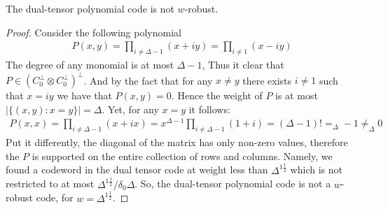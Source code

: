 \begin{claim}
 \label{claim:nowr} The dual-tensor polynomial code is not $w$-robust. 
\end{claim}

\begin{proof}
Consider the following polynomial 
  \begin{equation*}
    \begin{split}
      P(x,y) = \prod_{i \neq \Delta - 1}{ \left( x + i y \right)  }=\prod_{i \neq  1}{ \left( x - i y \right)  }  
         \end{split}
  \end{equation*}
  The degree of any monomial is at most $\Delta-1$, Thus it clear that $P \in \left( C_{0}^{\perp} \otimes C_{0}^{\perp} \right)^{\perp}$. And by the fact that for any $x \neq y$ there exists $i\neq 1 $ such that $x = iy$ we have that $P(x,y) = 0$. Hence the weight of $P$ is at most $|\{ (x,y) : x = y \}|= \Delta$. Yet, for any $x = y$ it follows:      
  \begin{equation*}
    \begin{split}
       P(x,x) = \prod_{i \neq \Delta - 1}{ \left( x + i x \right)  }= x^{\Delta-1}\prod_{i \neq \Delta - 1}{ \left( 1 + i \right) } = \left( \Delta-1 \right)!  =_{\Delta} -1  \neq_{\Delta} 0 
    \end{split}
  \end{equation*}
  Put it differently, the diagonal of the matrix has only non-zero values, therefore the $P$ is supported on the entire collection of rows and columns. Namely, we found a codeword in the dual tensor code at weight less than $\Delta^{1 \frac{1}{2}}$ which is not restricted to at most $\Delta^{1 \frac{1}{2}} / \delta_{0}\Delta$. So, the dual-tensor polynomial code is not a $w$-robust code,  for $w = \Delta^{1 \frac{1}{2}}$.   
\end{proof}


